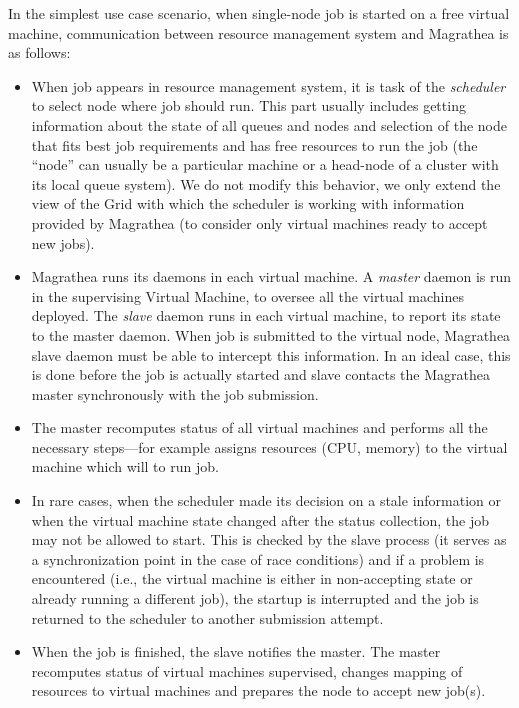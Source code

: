 \documentclass{sig-alternate}
\begin{document}
In the simplest use case scenario, when single-node job is started on a free virtual machine, communication between resource 
management system and Magrathea is as follows:
\begin{itemize}
\item When job appears in resource management system, it is task of the \textit{scheduler} to select node where job 
should run. This part usually includes getting information about the
state of all queues and nodes and selection of the node that fits best
job requirements and has free resources to run the job (the ``node'' can
usually be a particular machine or a head-node of a cluster with its local 
queue system). We do not modify this behavior, we only extend the view
of the Grid with which the scheduler is working with information provided
by Magrathea (to consider only virtual machines ready to accept new
jobs).
\item Magrathea runs its daemons in each virtual machine. A \emph{master}
daemon is run in the supervising Virtual Machine, to oversee all the virtual
machines deployed. The \emph{slave} daemon runs in each virtual machine,
to report its state to the master daemon. When job is
submitted to the virtual node, Magrathea slave daemon must be able to
intercept this information. In an ideal 
case, this is done before the job is actually started and slave contacts
the Magrathea master synchronously with the job submission.
\item The master recomputes status of all virtual machines and performs
all the necessary steps---for example assigns resources (CPU, memory) to the
virtual machine which will to run job. 
\item In rare cases, when the scheduler made its decision on a stale
information  or when the virtual machine state changed after the status
collection, the job may not be allowed to start. This is checked by the
slave process (it serves as a synchronization point in the case of race
conditions) and if a problem is encountered (i.e., the virtual machine is
either in non-accepting state or already running a different job), the
startup is interrupted and the job is returned to the scheduler to
another submission attempt.
\item When the job is finished, the slave notifies the master. The master
recomputes status of virtual machines supervised, changes mapping of
resources to virtual machines and prepares the node to accept new job(s).
\end{itemize}
\end{document}
